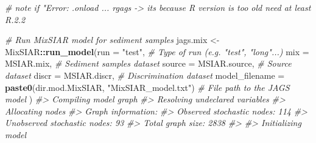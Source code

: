 \documentclass[
]{article}
\newenvironment{Shaded}{\begin{snugshade}}{\end{snugshade}}
\newcommand{\AttributeTok}[1]{\textcolor[rgb]{0.13,0.29,0.53}{#1}}
\newcommand{\CommentTok}[1]{\textcolor[rgb]{0.56,0.35,0.01}{\textit{#1}}}
\newcommand{\FunctionTok}[1]{\textcolor[rgb]{0.13,0.29,0.53}{\textbf{#1}}}
\newcommand{\NormalTok}[1]{#1}
\newcommand{\OtherTok}[1]{\textcolor[rgb]{0.56,0.35,0.01}{#1}}
\newcommand{\SpecialCharTok}[1]{\textcolor[rgb]{0.81,0.36,0.00}{\textbf{#1}}}
\newcommand{\StringTok}[1]{\textcolor[rgb]{0.31,0.60,0.02}{#1}}
\begin{document}
\begin{Shaded}
\begin{Highlighting}[]
\CommentTok{\# note if "Error: .onload ... \textquotesingle{}rgags\textquotesingle{} {-}\textgreater{} it\textquotesingle{}s because R version is too old need at least R.2.2}

\CommentTok{\# Run MixSIAR model for sediment samples}
\NormalTok{jags.mix }\OtherTok{\textless{}{-}}\NormalTok{ MixSIAR}\SpecialCharTok{::}\FunctionTok{run\_model}\NormalTok{(}\AttributeTok{run =} \StringTok{"test"}\NormalTok{,                                                 }\CommentTok{\# Type of run (e.g. "test", "long"...)}
                               \AttributeTok{mix =}\NormalTok{ MSIAR.mix,                                              }\CommentTok{\# Sediment samples dataset}
                               \AttributeTok{source =}\NormalTok{ MSIAR.source,                                        }\CommentTok{\# Source dataset}
                               \AttributeTok{discr =}\NormalTok{ MSIAR.discr,                                          }\CommentTok{\# Discrimination dataset}
                               \AttributeTok{model\_filename =} \FunctionTok{paste0}\NormalTok{(dir.mod.MixSIAR, }\StringTok{"MixSIAR\_model.txt"}\NormalTok{) }\CommentTok{\# File path to the JAGS model}
\NormalTok{                               )}
\CommentTok{\#\textgreater{} Compiling model graph}
\CommentTok{\#\textgreater{}    Resolving undeclared variables}
\CommentTok{\#\textgreater{}    Allocating nodes}
\CommentTok{\#\textgreater{} Graph information:}
\CommentTok{\#\textgreater{}    Observed stochastic nodes: 114}
\CommentTok{\#\textgreater{}    Unobserved stochastic nodes: 93}
\CommentTok{\#\textgreater{}    Total graph size: 2838}
\CommentTok{\#\textgreater{} }
\CommentTok{\#\textgreater{} Initializing model}
\end{Highlighting}
\end{Shaded}
\end{document}
